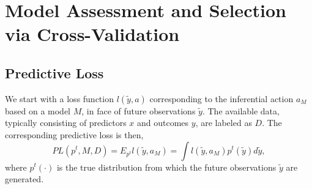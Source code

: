\documentclass[sii]{ipart}
\begin{document}




\section{Model Assessment and Selection via Cross-Validation}

\subsection{Predictive Loss}
We start with a loss function $l(\tilde y, a)$ corresponding to the inferential
action $a_M$ based on a model $M$, in face of future observations $\tilde y$. The
available data, typically consisting of predictors $x$ and outcomes $y$, are
labeled as $D$. The corresponding predictive loss is then,
\begin{equation}
  \label{eq:explossgeneral}
  PL(p^t, M, D)=E_{p^t}l(\tilde y, a_M)=\int l(\tilde y, a_M) p^t(\tilde y)d\tilde y,
\end{equation}
where $p^t(\cdot)$ is the true distribution from which the future observations
$\tilde y$ are generated.
\end{document}
